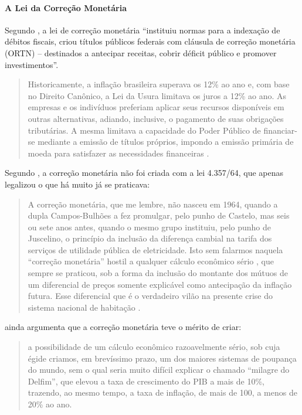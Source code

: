 \documentclass[]{article}
\let\oldparagraph\paragraph
\renewcommand{\paragraph}[1]{\oldparagraph{#1}\mbox{}}
\begin{document}
\paragraph{A Lei da Correção
Monetária}\label{a-lei-da-correcao-monetaria}

Segundo , a lei de correção monetária
``instituiu normas para a indexação de débitos fiscais, criou títulos
públicos federais com cláusula de correção monetária (ORTN) --
destinados a antecipar receitas, cobrir déficit público e promover
investimentos''.

\begin{quote}
Historicamente, a inflação brasileira superava os 12\% ao ano e, com
base no Direito Canônico, a Lei da Usura limitava os juros a 12\% ao
ano. As empresas e os indivíduos preferiam aplicar seus recursos
disponíveis em outras alternativas, adiando, inclusive, o pagamento de
suas obrigações tributárias. A mesma limitava a capacidade do Poder
Público de financiar-se mediante a emissão de títulos próprios, impondo
a emissão primária de moeda para satisfazer as necessidades financeiras
\cite[p.~15]{fortuna2015}.
\end{quote}

Segundo , a correção monetária não foi
criada com a lei 4.357/64, que apenas legalizou o que há muito já se
praticava:

\begin{quote}
A correção monetária, que me lembre, não nasceu em 1964, quando a dupla
Campos-Bulhões a fez promulgar, pelo punho de Castelo, mas seis ou sete
anos antes, quando o mesmo grupo instituiu, pelo punho de Juscelino, o
princípio da inclusão da diferença cambial na tarifa dos serviços de
utilidade pública de eletricidade. Isto sem falarmos naquela ``correção
monetária'' hostil a qualquer cálculo econômico sério , que sempre se
praticou, sob a forma da inclusão do montante dos mútuos de um
diferencial de preços somente explicável como antecipação da inflação
futura. Esse diferencial que é o verdadeiro vilão na presente crise do
sistema nacional de habitação \cite[p.~411]{rangel1983}.
\end{quote}

 ainda argumenta que a correção monetária
teve o mérito de criar:

\begin{quote}
a possibilidade de um cálculo econômico razoavelmente sério, sob cuja
égide criamos, em brevíssimo prazo, um dos maiores sistemas de poupança
do mundo, sem o qual seria muito difícil explicar o chamado ``milagre do
Delfim'', que elevou a taxa de crescimento do PIB a mais de 10\%,
trazendo, ao mesmo tempo, a taxa de inflação, de mais de 100, a menos de
20\% ao ano.
\end{quote}
\end{document}
